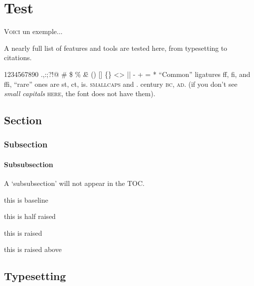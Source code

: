 \chapter{Test}
\label{sec:test}

\lettrine[lines=4, lraise=0.1, nindent=0em, slope=-.5em]%
{\textcolor{PolyU}{V}}{oici} un exemple... 

\lettrine[lines=6, slope=0.5em, findent=-1em]%
{A}{} nearly full list of features and tools are tested here, from typesetting to citations. 

\blindtext[1]

\bigskip



1234567890 .,:;?!@ \# \$ \% \^ \& \* () [] \{\} <> || - + = * ``Common'' ligatures ff, fi, and ffi, ``rare'' ones are st, ct, is. \textsc{smallcaps} and .      century \textsc{bc}, \textsc{ad}. (if you don't see \emph{small capitals} \textsc{here}, the font does not have them).

\noindent{\color{black}\rule{\linewidth}{0.2mm}} 

\section{Section}

\subsection{Subsection}

\subsubsection{Subsubsection} 

A `subsubsection' will not appear in the TOC. 


\noindent{\color{black}\rule{0.25\linewidth}{0.2mm}} this is baseline

\noindent{\color{black}\rule[0.5ex]{0.25\linewidth}{0.2mm}} this is half raised

\noindent{\color{black}\rule[1ex]{0.25\linewidth}{0.2mm}} this is raised

\noindent{\color{black}\rule[1.5ex]{0.25\linewidth}{0.2mm}} this is raised above

\section{Typesetting}

